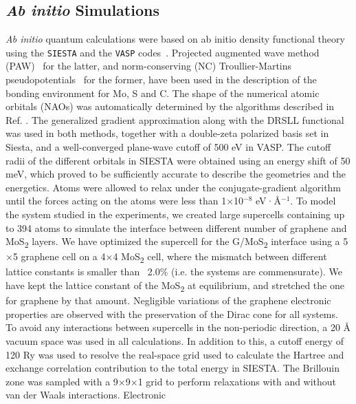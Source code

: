 \subsection*{\textit{Ab initio} Simulations}
\label{sec:ab-init-simul}
\textit{Ab initio} quantum calculations were based on ab initio
density functional theory using the
\texttt{SIESTA}\autocite{Soler_02_siesta} and the \texttt{VASP}
codes~\autocite{Kresse_1996_1,Kresse_1996_2}.  Projected augmented wave
method (PAW)~\autocite{Blochl_1994_PW} for the latter, and norm-conserving
(NC) Troullier-Martins pseudo\-potentials~\autocite{troullier91} for the
former, have been used in the description of the bonding environment
for Mo, S and C. The shape of the numerical atomic orbitals (NAOs) was
automatically determined by the algorithms described in
Ref. \cite{Soler_02_siesta}. The generalized gradient
approximation\autocite{Perdew_1996_GGA} along with the DRSLL
functional\autocite{Dion_2004_vdw} was used in both methods, together with
a double-zeta polarized basis set in Siesta, and a well-converged
plane-wave cutoff of 500 eV in VASP. The cutoff radii of the different
orbitals in SIESTA were obtained using an energy shift of 50 meV,
which proved to be sufficiently accurate to describe the geometries
and the energetics. Atoms were allowed to relax under the
conjugate-gradient algorithm until the forces acting on the atoms were
less than 1$\times$10$^{-8}$ eV·Å$^{-1}$.  To model the system studied in the
experiments, we created large supercells containing up to 394 atoms to
simulate the interface between different number of graphene and
MoS\textsubscript{2} layers. We have optimized the supercell for the
G/MoS\textsubscript{2} interface using a 5$\times{}$5 graphene cell on
a 4$\times{}$4 MoS\textsubscript{2} cell, where the mismatch between
different lattice constants is smaller than ~2.0\% (i.e. the systems
are commensurate). We have kept the lattice constant of the
MoS\textsubscript{2} at equilibrium, and stretched the one for
graphene by that amount. Negligible variations of the graphene
electronic properties are observed with the preservation of the Dirac
cone for all systems. To avoid any interactions between supercells in
the non-periodic direction, a 20 Å vacuum space was used in all
calculations. In addition to this, a cutoff energy of 120 Ry was used
to resolve the real-space grid used to calculate the Hartree and
exchange correlation contribution to the total energy in SIESTA. The
Brillouin zone was sampled with a 9×9×1 grid to perform relaxations
with and without van der Waals interactions. Electronic
